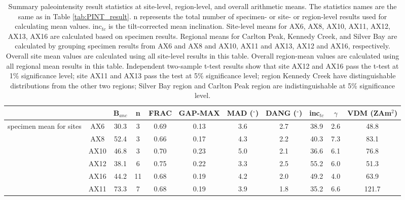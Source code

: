 \documentclass[9pt,twoside,lineno]{pnas-new}
\begin{document}
\begin{table}[]
\centering
\caption{\footnotesize{Summary paleointensity result statistics at site-level, region-level, and overall arithmetic means. The statistics names are the same as in Table \ref{tab:PINT_result}}. n represents the total number of specimen- or site- or region-level results used for calculating mean values. inc$_{tc}$ is the tilt-corrected mean inclination. Site-level means for AX6, AX8, AX10, AX11, AX12, AX13, AX16 are calculated based on specimen results. Regional means for Carlton Peak, Kennedy Creek, and Silver Bay are calculated by grouping specimen results from AX6 and AX8 and AX10, AX11 and AX13, AX12 and AX16, respectively. Overall site mean values are calculated using all site-level results in this table. Overall region-mean values are calculated using all regional mean results in this table. Independent two-sample t-test results show that site AX12 and AX16 pass the t-test at 1\% significance level; site AX11 and AX13 pass the test at 5\% significance level; region Kennedy Creek have distinguishable distributions from the other two regions; Silver Bay region and Carlton Peak region are indistinguishable at 5\% significance level.}
\begin{tabular}{ccccccccccc}
\hline
\multicolumn{1}{l}{}                       &               & B$_{anc}$ & n  & FRAC & GAP-MAX & MAD ($^\circ$) & DANG ($^\circ$) & inc$_{tc}$ & $\gamma$ & VDM (ZAm$^2$) \\
\hline
\multirow{7}{*}{specimen mean for sites}   & AX6           & 30.3     & 3  & 0.69 & 0.13    & 3.6           & 2.7            & 38.9       & 2.6     & 48.8         \\
                                           & AX8           & 52.4      & 3  & 0.66 & 0.17    & 4.3           & 2.2            & 40.3       & 7.3      & 83.1         \\
                                           & AX10          & 46.8     & 3  & 0.70  & 0.23    & 5.0           & 2.1            & 36.6       & 6.1      & 76.8         \\
                                           & AX12          & 38.1      & 6  & 0.75 & 0.22    & 3.3           & 2.5            & 55.2       & 6.0     & 51.3         \\
                                           & AX16          & 44.2     & 11 & 0.68 & 0.19    & 4.2           & 2.0            & 49.2       & 4.0     & 63.9         \\
                                           & AX11          & 73.3     & 7  & 0.68 & 0.19    & 3.9           & 1.8            & 35.2       & 6.6     & 121.7        \\

\end{tabular}
\end{table}
\end{document}
